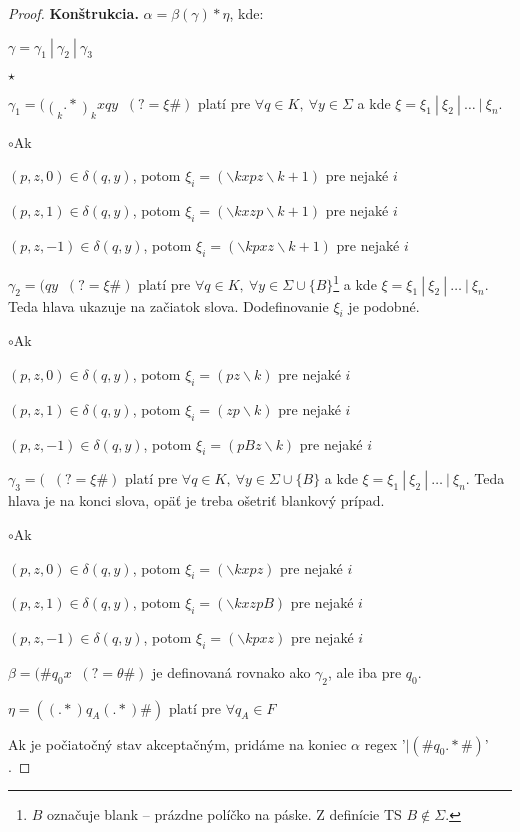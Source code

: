 \begin{proof}
\textbf{Konštrukcia.} $\alpha = \beta(\gamma)*\eta$, kde:
\begin{itemize}
\item $\gamma = \gamma_1~|~\gamma_2~|~\gamma_3$
\begin{list}{$\star$}{}
\item $ \displaystyle \gamma_1 = (\mathop(_k.*\mathop)_k x q y \mathop(_{k+1} .* \mathop)_{k+1} \#)(?= \xi \#)$ platí pre $\forall q \in K,~\forall y \in \Sigma$ a kde $ \xi = \xi_1 ~|~ \xi_2 ~|~ \dots ~|~ \xi_n $.
\begin{list}{$\circ$}{Ak}
\item $ (p,z,0) \in \delta(q,y)$, potom $\xi_i = (\backslash kx p z \backslash k+1)$ pre nejaké $i$
\item $ (p,z,1) \in \delta(q,y)$, potom $\xi_i = (\backslash kx z p \backslash k+1)$ pre nejaké $i$
\item $ (p,z,-1) \in \delta(q,y)$, potom $\xi_i = (\backslash kp x z \backslash k+1)$ pre nejaké $i$
\end{list}
\item $ \displaystyle \gamma_2 = (q y \mathop(_{k} .* \mathop)_{k+1} \#)(?= \xi \#)$ platí pre $\forall q \in K,~\forall y \in \Sigma \cup \lbrace B \rbrace$\footnote{$B$ označuje blank -- prázdne políčko na páske. Z definície TS $B \notin \Sigma$.} a kde $ \xi = \xi_1 ~|~ \xi_2 ~|~ \dots ~|~ \xi_n $. Teda hlava ukazuje na začiatok slova. Dodefinovanie $\xi_i$ je podobné.
\begin{list}{$\circ$}{Ak}
\item $ (p,z,0) \in \delta(q,y)$, potom $\xi_i = (p z \backslash k)$ pre nejaké $i$
\item $ (p,z,1) \in \delta(q,y)$, potom $\xi_i = (z p \backslash k)$ pre nejaké $i$
\item $ (p,z,-1) \in \delta(q,y)$, potom $\xi_i = (p B z \backslash k)$ pre nejaké $i$ 
\end{list}
\item $ \displaystyle \gamma_3 = (\mathop(_k.*\mathop)_k x q y \#)(?= \xi \#)$ platí pre $\forall q \in K,~\forall y \in \Sigma \cup \lbrace B \rbrace$ a kde $ \xi = \xi_1 ~|~ \xi_2 ~|~ \dots ~|~ \xi_n $. Teda hlava je na konci slova, opäť je treba ošetriť blankový prípad.
\begin{list}{$\circ$}{Ak}
\item $ (p,z,0) \in \delta(q,y)$, potom $\xi_i = (\backslash kx p z)$ pre nejaké $i$
\item $ (p,z,1) \in \delta(q,y)$, potom $\xi_i = (\backslash kx z p B)$ pre nejaké $i$
\item $ (p,z,-1) \in \delta(q,y)$, potom $\xi_i = (\backslash kp x z)$ pre nejaké $i$
\end{list}
\end{list}
\item $\displaystyle \beta = (\#q_0x\mathop(_k.*\mathop)_k\#)(?=\theta\#) $ je definovaná rovnako ako $\gamma_2$, ale iba pre $q_0$.
\item $\eta = ((.*) q_A (.*)\#)$ platí pre $\forall q_A \in F$
\end{itemize}
Ak je počiatočný stav akceptačným, pridáme na koniec $\alpha$ regex '$| (\#q_0.*\#)$' .
\end{proof}

